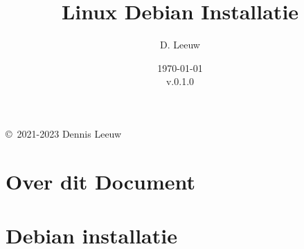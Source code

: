 \documentclass[a4paper,12pt,twoside,openright,titlepage]{book}
\author{D. Leeuw}
\title{Linux Debian Installatie}
\date{\today\\v.0.1.0}
\begin{document}

\maketitle

\copyright\ 2021-2023 Dennis Leeuw\\




\frontmatter
\chapter{Over dit Document}
%
%

\tableofcontents

\mainmatter

\chapter{Debian installatie}


\printindex
\end{document}
